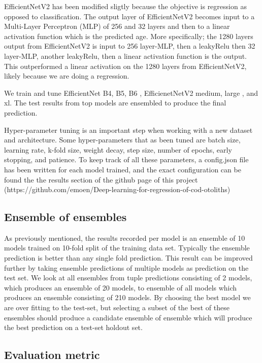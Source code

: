 \documentclass[10pt,letterpaper]{article}
\begin{document}
EfficientNetV2 has been modified sligtly because the objective is regression as opposed to classification. The output layer of EfficientNetV2 becomes input to a Multi-Layer Perceptron (MLP) of 256 and 32 layers and then to a linear activation function which is the predicted age. More specifically; the 1280 layers output from EfficientNetV2 is input to 256 layer-MLP, then a leakyRelu \citep{DBLP:journals/corr/XuWCL15} then 32 layer-MLP, another leakyRelu, then a linear activation function is the output. This outperformed a linear activation on the 1280 layers from EfficientNetV2, likely because we are doing a regression.

We train and tune EfficientNet B4, B5, B6 \citep{DBLP:journals/corr/abs-1905-11946}, EfficienetNetV2 medium, large \citep{DBLP:journals/corr/abs-1905-11946}, and xl. 
The test results from top models are ensembled to produce the final prediction.

Hyper-parameter tuning is an important step when working with a new dataset and architecture. Some hyper-parameters
that as been tuned are batch size, learning rate, k-fold size, weight decay, step size, number of epochs, early stopping, and
patience. To keep track of all these parameters, a config.json file has been written for each model trained, and 
the exact configuration can be found the the results section of the github page of this project
(https://github.com/emoen/Deep-learning-for-regression-of-cod-otoliths)


\subsection*{Ensemble of ensembles}

As previously mentioned, the results recorded per model is an ensemble of 10 models trained on 10-fold split of the
training data set. Typically the ensemble prediction is better than any single fold prediction. 
This result can be improved further by taking ensemble predictions of multiple models as prediction on the test set.
We look at all ensembles from tuple predictions consisting of 2 models, which produces an ensemble of 20 models,
to ensemble of all models which produces an ensemble consisting of 210 models. 
By choosing the best model we are over fitting to the test-set, but 
selecting a subset of the best of these ensembles should produce a candidate ensemble
of ensemble which will produce the best prediction on a test-set holdout set.

\subsection*{Evaluation metric}
\end{document}
